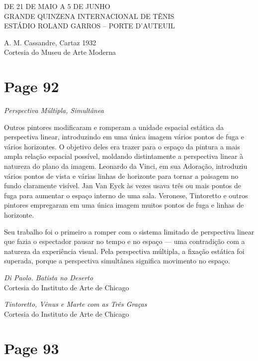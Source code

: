 \documentclass[a4paper]{article}
\begin{document}
DE 21 DE MAIO A 5 DE JUNHO\\
GRANDE QUINZENA INTERNACIONAL DE TÊNIS\\
ESTÁDIO ROLAND GARROS -- PORTE D'AUTEUIL

A. M. Cassandre, Cartaz 1932\\
Cortesia do Museu de Arte Moderna

\newpage
\section*{Page 92}

{\itshape Perspectiva Múltipla, Simultânea}

\vspace{1.5em}

Outros pintores modificaram e romperam a unidade espacial estática da perspectiva linear, introduzindo em uma única imagem vários pontos de fuga e vários horizontes. O objetivo deles era trazer para o espaço da pintura a mais ampla relação espacial possível, moldando distintamente a perspectiva linear à natureza do plano da imagem. Leonardo da Vinci, em sua Adoração, introduziu vários pontos de vista e várias linhas de horizonte para tornar a paisagem no fundo claramente visível. Jan Van Eyck às vezes usava três ou mais pontos de fuga para aumentar o espaço interno de uma sala. Veronese, Tintoretto e outros pintores empregaram em uma única imagem muitos pontos de fuga e linhas de horizonte.

Seu trabalho foi o primeiro a romper com o sistema limitado de perspectiva linear que fazia o espectador pausar no tempo e no espaço — uma contradição com a natureza da experiência visual. Pela perspectiva múltipla, a fixação estática foi superada, porque a perspectiva simultânea significa movimento no espaço.

\vspace{2em}

\footnotesize
{\itshape Di Paolo. Batista no Deserto} \\
Cortesia do Instituto de Arte de Chicago

\vspace{1em}

\footnotesize
{\itshape Tintoretto, Vênus e Marte com as Três Graças} \\
Cortesia do Instituto de Arte de Chicago

\vfill
{}

\newpage
\section*{Page 93}
\end{document}

